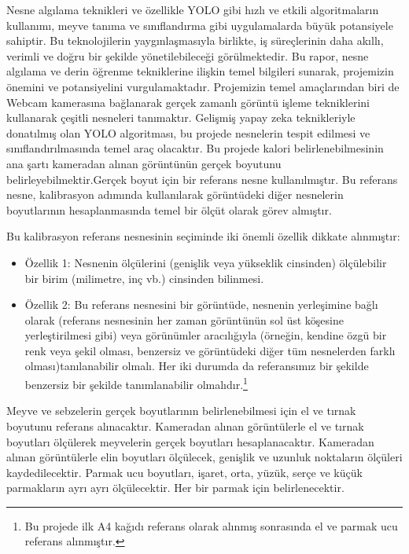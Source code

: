 \documentclass[11pt,a4paper]{report}
\begin{document}
    Nesne algılama teknikleri ve özellikle YOLO gibi hızlı ve etkili algoritmaların kullanımı, meyve tanıma ve sınıflandırma gibi uygulamalarda büyük potansiyele sahiptir. Bu teknolojilerin yaygınlaşmasıyla birlikte, iş süreçlerinin daha akıllı, verimli ve doğru bir şekilde yönetilebileceği görülmektedir. Bu rapor, nesne algılama ve derin öğrenme tekniklerine ilişkin temel bilgileri sunarak, projemizin önemini ve potansiyelini vurgulamaktadır.
    Projemizin temel amaçlarından biri de Webcam kamerasına bağlanarak gerçek zamanlı görüntü işleme tekniklerini kullanarak çeşitli nesneleri tanımaktır. Gelişmiş yapay zeka teknikleriyle donatılmış olan YOLO algoritması, bu projede nesnelerin tespit edilmesi ve sınıflandırılmasında temel araç olacaktır.
    Bu projede kalori belirlenebilmesinin ana şartı kameradan alınan görüntünün gerçek boyutunu belirleyebilmektir.Gerçek boyut için bir referans nesne kullanılmıştır. Bu referans nesne, kalibrasyon adımında kullanılarak görüntüdeki diğer nesnelerin boyutlarının hesaplanmasında temel bir ölçüt olarak görev almıştır.
    \newline

    Bu kalibrasyon referans nesnesinin seçiminde iki önemli özellik dikkate alınmıştır:
    \begin{itemize}
	   \item Özellik 1: Nesnenin ölçülerini (genişlik veya yükseklik cinsinden) ölçülebilir bir birim (milimetre, inç vb.) cinsinden bilinmesi.
	   \item Özellik 2: Bu referans nesnesini bir görüntüde, nesnenin yerleşimine bağlı olarak (referans nesnesinin  her zaman görüntünün sol üst köşesine yerleştirilmesi gibi) veya görünümler aracılığıyla (örneğin, kendine özgü bir renk veya şekil olması, benzersiz ve görüntüdeki diğer tüm nesnelerden farklı olması)tanılanabilir olmalı. Her iki durumda da referansımız bir şekilde benzersiz bir şekilde tanımlanabilir olmalıdır.\footnote{Bu projede ilk A4 kağıdı referans olarak alınmış sonrasında el ve parmak ucu referans alınmıştır.}\newline
	   
    \end{itemize}
    
    
	Meyve ve sebzelerin gerçek boyutlarının belirlenebilmesi için el ve tırnak boyutunu referans alınacaktır. Kameradan alınan görüntülerle el ve tırnak boyutları ölçülerek meyvelerin gerçek boyutları hesaplanacaktır.
	Kameradan alınan görüntülerle elin boyutları ölçülecek, genişlik ve uzunluk noktaların ölçüleri kaydedilecektir. Parmak ucu boyutları, işaret, orta, yüzük, serçe ve küçük parmakların ayrı ayrı ölçülecektir. Her bir parmak için belirlenecektir.\newline
	
\end{document}
